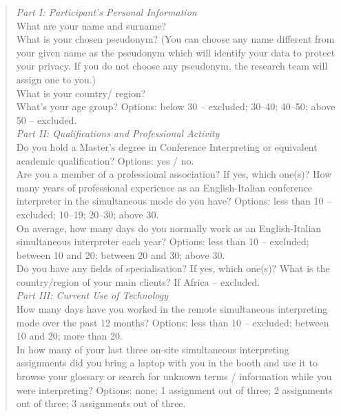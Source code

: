 \begin{quote}
    \textit{Part I: Participant’s Personal Information}\\

What are your name and surname?\\

What is your chosen pseudonym? (You can choose any name different from your given name as the pseudonym which will identify your data to protect your privacy. If you do not choose any pseudonym, the research team will assign one to you.)\\

What is your country/ region?\\

What’s your age group? Options: below 30 -- excluded; 30--40; 40--50; above 50 -- excluded.\\

\textit{Part II: Qualifications and Professional Activity}\\

Do you hold a Master's degree in Conference Interpreting or equivalent academic qualification? Options: yes / no.\\

Are you a member of a professional association? If yes, which one(s)?
How many years of professional experience as an English-Italian conference interpreter in the simultaneous mode do you have? Options: less than 10 -- excluded; 10--19; 20--30; above 30.\\

On average, how many days do you normally work as an English-Italian simultaneous interpreter each year? Options: less than 10 -- excluded; between 10 and 20; between 20 and 30; above 30.\\

Do you have any fields of specialisation? If yes, which one(s)?
What is the country/region of your main clients? If Africa -- excluded.\\

\textit{Part III: Current Use of Technology}\\

How many days have you worked in the remote simultaneous interpreting mode over the past 12 months? Options: less than 10 -- excluded; between 10 and 20; more than 20.\\

In how many of your last three on-site simultaneous interpreting assignments did you bring a laptop with you in the booth and use it to browse your glossary or search for unknown terms / information while you were interpreting? Options: none; 1 assignment out of three; 2 assignments out of three; 3 assignments out of three.\\


\end{quote}
